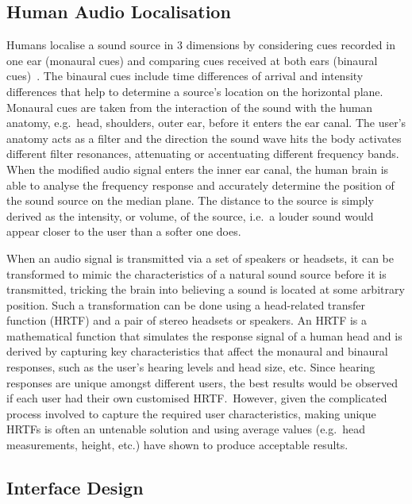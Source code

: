 \documentclass{llncs}
\begin{document}
\subsection{Human Audio Localisation}

Humans localise a sound source in 3 dimensions by considering cues recorded in one ear (monaural cues) and comparing cues received at both ears (binaural cues)~\cite{blauert1997spatial,blauert1969sound}.
The binaural cues include time differences of arrival and intensity differences that help to determine a source's location on the horizontal plane.
Monaural cues are taken from the interaction of the sound with the human anatomy, e.g.\ head, shoulders, outer ear, before it enters the ear canal.
The user's anatomy acts as a filter and the direction the sound wave hits the body activates different filter resonances, attenuating or accentuating different frequency bands.
When the modified audio signal enters the inner ear canal, the human brain is able to analyse the frequency response and accurately determine the position of the sound source on the median plane. 
The distance to the source is simply derived as the intensity, or volume, of the source, i.e.\ a louder sound would appear closer to the user than a softer one does. 

When an audio signal is transmitted via a set of speakers or headsets, it can be transformed to mimic the characteristics of a natural sound source before it is transmitted, tricking the brain into believing a sound is located at some arbitrary position.
Such a transformation can be done using a head-related transfer function (HRTF) and a pair of stereo headsets or speakers.
An HRTF is a mathematical function that simulates the response signal of a human head and is derived by capturing key characteristics that affect the monaural and binaural responses, such as the user's hearing levels and head size, etc.
Since hearing responses are unique amongst different users, the best results would be observed if each user had their own customised HRTF.\
However, given the complicated process involved to capture the required user characteristics, making unique HRTFs is often an untenable solution and using average values (e.g.\ head measurements, height, etc.) have shown to produce acceptable results.

\subsection{Interface Design}
\end{document}
